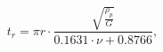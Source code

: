 \begin{equation}
\label{eq:rayleightime}
t_r = \pi r \cdot \frac{\sqrt{\frac{\rho_p}{G}}}{0.1631 \cdot \nu +
0.8766},
\end{equation}

